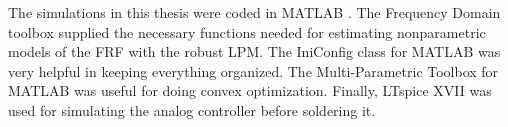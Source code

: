 The simulations in this thesis were coded in MATLAB \cite{MATLAB}. The Frequency Domain toolbox \cite{pintelon_book} supplied the necessary functions needed for estimating nonparametric models of the FRF with the robust LPM. The IniConfig class for \mbox{MATLAB} \cite{iniconfig} was very helpful in keeping everything organized. The Multi-Parametric Toolbox for MATLAB \cite{MPT3} was useful for doing convex optimization. Finally, LTspice XVII was used for simulating the analog controller before soldering it.